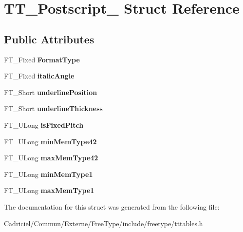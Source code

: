 \hypertarget{struct_t_t___postscript__}{\section{T\-T\-\_\-\-Postscript\-\_\- Struct Reference}
\label{struct_t_t___postscript__}
}
\subsection*{Public Attributes}
\begin{DoxyCompactItemize}
\item 
\hypertarget{struct_t_t___postscript___a5ed6585c01fa4ffc3f8537d58bdd955f}{F\-T\-\_\-\-Fixed {\bfseries Format\-Type}}\label{struct_t_t___postscript___a5ed6585c01fa4ffc3f8537d58bdd955f}

\item 
\hypertarget{struct_t_t___postscript___adcca36c7fbcbdff00fc8c2884a215830}{F\-T\-\_\-\-Fixed {\bfseries italic\-Angle}}\label{struct_t_t___postscript___adcca36c7fbcbdff00fc8c2884a215830}

\item 
\hypertarget{struct_t_t___postscript___a909fd5064ab7547bb8ed984b5dfe2fe2}{F\-T\-\_\-\-Short {\bfseries underline\-Position}}\label{struct_t_t___postscript___a909fd5064ab7547bb8ed984b5dfe2fe2}

\item 
\hypertarget{struct_t_t___postscript___a4e4654766a4f27054c9a35958515e186}{F\-T\-\_\-\-Short {\bfseries underline\-Thickness}}\label{struct_t_t___postscript___a4e4654766a4f27054c9a35958515e186}

\item 
\hypertarget{struct_t_t___postscript___ab9a537994be4f81cb35f61f83cd97949}{F\-T\-\_\-\-U\-Long {\bfseries is\-Fixed\-Pitch}}\label{struct_t_t___postscript___ab9a537994be4f81cb35f61f83cd97949}

\item 
\hypertarget{struct_t_t___postscript___ad78af4931654c197d4a8d0f04d473885}{F\-T\-\_\-\-U\-Long {\bfseries min\-Mem\-Type42}}\label{struct_t_t___postscript___ad78af4931654c197d4a8d0f04d473885}

\item 
\hypertarget{struct_t_t___postscript___a70c4ba372d04e686208f0fede9885314}{F\-T\-\_\-\-U\-Long {\bfseries max\-Mem\-Type42}}\label{struct_t_t___postscript___a70c4ba372d04e686208f0fede9885314}

\item 
\hypertarget{struct_t_t___postscript___a91a8b40f60e67a1920209e6b08355848}{F\-T\-\_\-\-U\-Long {\bfseries min\-Mem\-Type1}}\label{struct_t_t___postscript___a91a8b40f60e67a1920209e6b08355848}

\item 
\hypertarget{struct_t_t___postscript___a944a3df5127262db0f7ae92868defb99}{F\-T\-\_\-\-U\-Long {\bfseries max\-Mem\-Type1}}\label{struct_t_t___postscript___a944a3df5127262db0f7ae92868defb99}

\end{DoxyCompactItemize}


The documentation for this struct was generated from the following file\-:\begin{DoxyCompactItemize}
\item 
Cadriciel/\-Commun/\-Externe/\-Free\-Type/include/freetype/tttables.\-h\end{DoxyCompactItemize}

